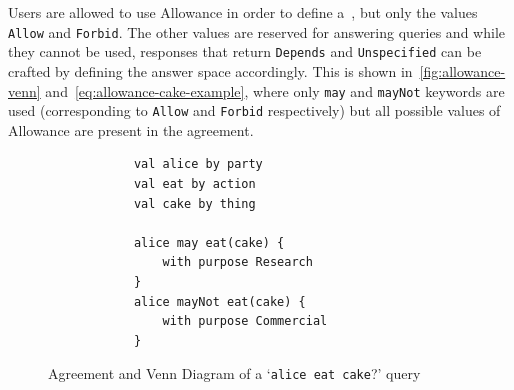Users are allowed to use Allowance in order to define a~, but only the values \texttt{Allow} and \texttt{Forbid}.
The other values are reserved for answering queries and while they cannot be used, responses that return \texttt{Depends} and \texttt{Unspecified} can be crafted by defining the answer space accordingly.
This is shown in~\autoref{fig:allowance-venn} and~\autoref{eq:allowance-cake-example}, where only \texttt{may} and \texttt{mayNot} keywords are used (corresponding to \texttt{Allow} and \texttt{Forbid} respectively) but all possible values of Allowance are present in the agreement.

\begin{figure}[h]
    \centering
    \begin{minipage}{0.5\textwidth}
        \begin{verbatim}
            val alice by party
            val eat by action
            val cake by thing

            alice may eat(cake) {
                with purpose Research
            }
            alice mayNot eat(cake) {
                with purpose Commercial
            }
        \end{verbatim}
    \end{minipage}

    \vspace{0.2cm}


    \caption{Agreement and Venn Diagram of a `\texttt{alice eat cake}?' query}
    \label{fig:allowance-venn}
\end{figure}

